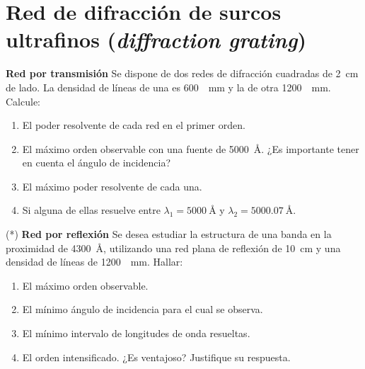 \section*{Red de difracción de surcos ultrafinos (\emph{diffraction grating})}



\item \textbf{Red por transmisión}
Se dispone de dos redes de difracción cuadradas de \SI{2}{\centi\metre} de lado.
La densidad de líneas de una es \SI{600}{\per\milli\metre} y la de otra \SI{1200}{\per\milli\metre}.
Calcule: 
\begin{enumerate}
	\item El poder resolvente de cada red en el primer orden. 
	\item El máximo orden observable con una fuente de \SI{5000}{\angstrom}. 
	¿Es importante tener en cuenta el ángulo de incidencia? 
	\item El máximo poder resolvente de cada una. 
	\item Si alguna de ellas resuelve entre $\lambda_1 = \SI{5000}{\angstrom}$ y $\lambda_2 = \SI{5000,07}{\angstrom}$.
\end{enumerate}




\item (*) 
\textbf{Red por reflexión}
Se desea estudiar la estructura de una banda en la proximidad de \SI{4300}{\angstrom}, utilizando una red plana de reflexión de \SI{10}{\centi\metre} y una densidad de líneas de \SI{1200}{\per\milli\metre}.
Hallar:
\begin{enumerate}
	\item El máximo orden observable. 
	\item El mínimo ángulo de incidencia para el cual se observa. 
	\item El mínimo intervalo de longitudes de onda resueltas. 
	\item El orden intensificado.
	¿Es ventajoso?
	Justifique su respuesta. 
\end{enumerate}

